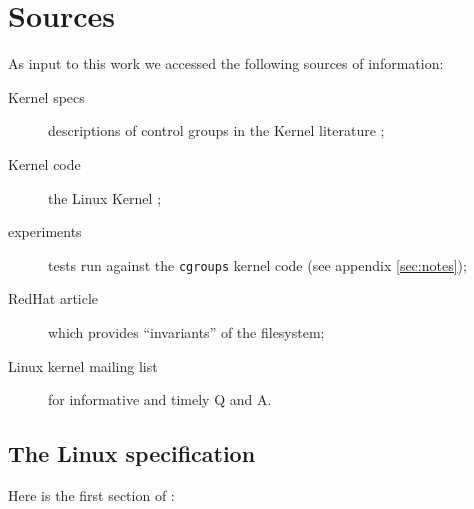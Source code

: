 \documentclass[a4paper,twoside,12pt]{article}
\begin{document}
\clearpage

\appendix




\section{Sources}
\label{sec:sources}

As input to this work we accessed the following sources of information:
\begin{description}
\item[Kernel specs] descriptions of control groups in the Kernel literature \cite{linuxgroups};
\item[Kernel code] the Linux Kernel \cite{linuxkernel};
\item[experiments] tests run against the \texttt{cgroups} kernel code (see appendix \ref{sec:notes});
\item[RedHat article] \cite{rharticle} which provides ``invariants'' of the filesystem;
\item[Linux kernel mailing list] \cite{noop} for informative and timely Q and A.
\end{description}

\subsection{The Linux specification \cite{linuxgroups}}

Here is the first section of \cite{linuxgroups}:
\end{document}
